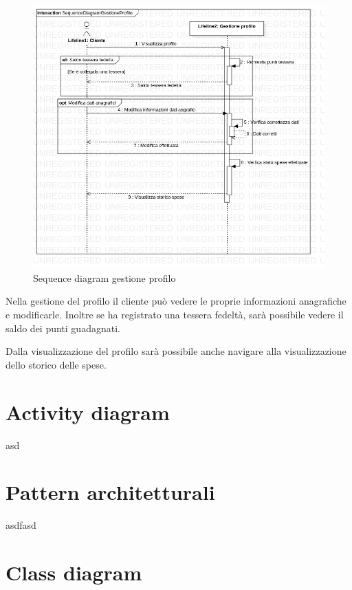 \documentclass[12pt, a4paper]{article}
\begin{document}
\begin{figure}[h]
\centering
\includegraphics[width=\textwidth]{Use Case Model!Gestione profilo!InteractionGestioneProfilo!SequenceDiagramGestioneProfilo_5.png}
\caption{Sequence diagram gestione profilo}
\end{figure}

Nella gestione del profilo il cliente può vedere le proprie informazioni 
anagrafiche e modificarle. Inoltre se ha registrato una tessera fedeltà, sarà
possibile vedere il saldo dei punti guadagnati.

Dalla visualizzazione del profilo sarà possibile anche navigare alla
visualizzazione dello storico delle spese.

\newpage

\section{Activity diagram}

asd


\section{Pattern architetturali}

asdfasd

\section{Class diagram}
\end{document}
